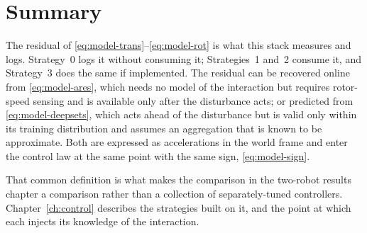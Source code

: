 \section{Summary}
\label{sec:model-summary}

The residual of \eqref{eq:model-trans}--\eqref{eq:model-rot} is what this stack measures and logs.
Strategy~0 logs it without consuming it; Strategies~1 and~2 consume it, and Strategy~3 does the
same if implemented. The residual can be recovered online from
\eqref{eq:model-ares}, which needs no model of the interaction but requires rotor-speed sensing and
is available only after the disturbance acts; or predicted from \eqref{eq:model-deepsets}, which
acts ahead of the disturbance but is valid only within its training distribution and assumes an
aggregation that is known to be approximate. Both are expressed as accelerations in the world frame
and enter the control law at the same point with the same sign, \eqref{eq:model-sign}.

That common definition is what makes the comparison in the two-robot results chapter a
comparison rather than a collection of separately-tuned controllers. Chapter~\ref{ch:control}
describes the strategies built on it, and the point at which each injects its knowledge of
the interaction.
